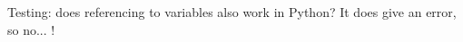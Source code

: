 \documentclass[output=inprep,
		biblatex
		]{LSP/langsci}\usepackage[]{graphicx}\usepackage[]{color}
\begin{document}
Testing: does referencing to variables also work in Python? It does give an error, so no... !






\begin{comment}
===
Double quotation marks are generally used for distancing, in particular in the following situations:

1. when a passage from another work is cited in the text (e.g. According to Takahashi (2009: 33), “quotatives were never used in subordinate clauses in Old Japanese”); but block quotations do not have quotation marks;
2. when a technical term is mentioned that the author does not want to adopt, but wants to mention, e.g. This is sometimes called “pseudo-conservatism”, but I will not use this term here, as it could lead to confusion.

Single quotation marks are used exclusively for linguistic meanings, as in the following: Latin habere ‘have’ is not cognate with Old English hafian ‘have’.

===
so, we should normally use double quotation in most of our cases :-). In general though, I would like us to try and remove double quotations as much as possible. Mostly is thus signals uncertainty on our part :-).

\end{comment}



\end{document}
